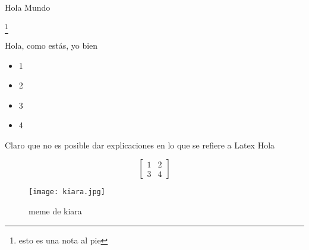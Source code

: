 Hola Mundo \cite{fly}

\lipsum[2] \footnote{esto es una nota al pie}

Hola, como estás, yo bien 

\begin{itemize}
    \item 1
    \item 2
    \item 3
    \item 4
\end{itemize}

Claro que no es posible dar explicaciones en lo que se refiere a Latex
Hola 

\begin{equation}
    \begin{bmatrix}
        1 & 2 \\
        3 & 4 
    \end{bmatrix}
\end{equation}

\begin{figure}[ht]
    \centerline{\texttt{[image: kiara.jpg]}}
    \caption{meme de kiara}
    \label{1}
\end{figure}

